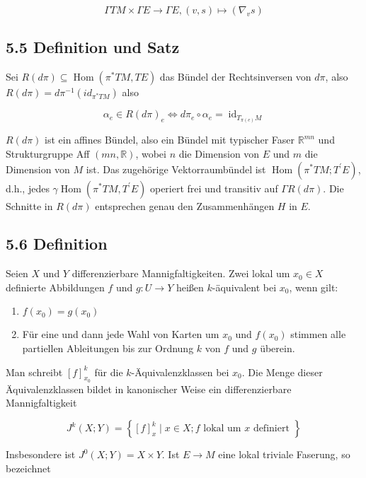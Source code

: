 $$
\Gamma T M \times \Gamma E \rightarrow \Gamma E,(v, s) \mapsto\left(\nabla_{v} s\right)
$$

\subsection*{5.5 Definition und Satz}
Sei $R(d \pi) \subseteq \operatorname{Hom}\left(\pi^{*} T M, T E\right)$ das Bündel der Rechtsinversen von $d \pi$, also $R(d \pi)=d \pi^{-1}\left(i d_{\pi^{*} T M}\right)$ also

$$
\alpha_{e} \in R(d \pi)_{e} \Leftrightarrow d \pi_{e} \circ \alpha_{e}=\operatorname{id}_{T_{\pi(e)} M}
$$

$R(d \pi)$ ist ein affines Bündel, also ein Bündel mit typischer Faser $\mathbb{R}^{m n}$ und Strukturgruppe Aff $(m n, \mathbb{R})$, wobei $n$ die Dimension von $E$ und $m$ die Dimension von $M$ ist. Das zugehörige Vektorraumbündel ist $\operatorname{Hom}\left(\pi^{*} T M ; T^{\prime} E\right)$, d.h., jedes $\gamma \operatorname{Hom}\left(\pi^{*} T M, T^{\prime} E\right)$ operiert frei und transitiv auf $\Gamma R(d \pi)$. Die Schnitte in $R(d \pi)$ entsprechen genau den Zusammenhängen $H$ in $E$.

\subsection*{5.6 Definition}
Seien $X$ und $Y$ differenzierbare Mannigfaltigkeiten. Zwei lokal um $x_{0} \in X$ definierte Abbildungen $f$ und $g: U \rightarrow Y$ heißen $k$-äquivalent bei $x_{0}$, wenn gilt:

\begin{enumerate}
  \item $f\left(x_{0}\right)=g\left(x_{0}\right)$
  \item Für eine und dann jede Wahl von Karten um $x_{0}$ und $f\left(x_{0}\right)$ stimmen alle partiellen Ableitungen bis zur Ordnung $k$ von $f$ und $g$ überein.
\end{enumerate}

Man schreibt $[f]_{x_{0}}^{k}$ für die $k$-Äquivalenzklassen bei $x_{0}$. Die Menge dieser Äquivalenzklassen bildet in kanonischer Weise ein differenzierbare Mannigfaltigkeit

$$
J^{k}(X ; Y)=\left\{[f]_{x}^{k} \mid x \in X ; f \text { lokal um } x \text { definiert }\right\}
$$

Insbesondere ist $J^{0}(X ; Y)=X \times Y$. Ist $E \rightarrow M$ eine lokal triviale Faserung, so bezeichnet

